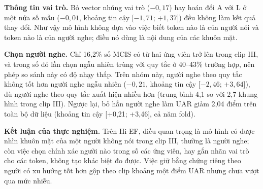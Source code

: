 \textbf{Thông tin vai trò.} Bỏ vector nhúng vai trò ($-0{,}17$) hay hoán đổi A với L ở một nửa số mẫu ($-0{,}01$, khoảng tin cậy [$-1{,}71$; $+1{,}37$]) đều không làm kết quả thay đổi. Như vậy mô hình không dựa vào việc biết token nào là của người nói và token nào là của người nghe; điều nó dùng là nội dung của các khuôn mặt.

\textbf{Chọn người nghe.} Chỉ 16,2\% số MCIS có từ hai ứng viên trở lên trong clip III, và trong số đó lần chọn ngẫu nhiên trùng với quy tắc ở 40--43\% trường hợp, nên phép so sánh này có độ nhạy thấp. Trên nhóm này, người nghe theo quy tắc không tốt hơn người nghe ngẫu nhiên ($-0{,}21$, khoảng tin cậy [$-2{,}46$; $+3{,}64$]), dù người nghe theo quy tắc xuất hiện nhiều hơn (trung bình 4,1 so với 2,7 khung hình trong clip III). Ngược lại, bỏ hẳn người nghe làm UAR giảm 2,04 điểm trên toàn bộ dữ liệu (khoảng tin cậy [+0,21; +3,46], cả năm fold).

\textbf{Kết luận của thực nghiệm.} Trên Hi-EF, điều quan trọng là mô hình có được nhìn khuôn mặt của một người không nói trong clip III, thường là người nghe; còn việc chọn chính xác người nào trong số các ứng viên, hay gắn nhãn vai trò cho các token, không tạo khác biệt đo được. Việc giữ bằng chứng riêng theo người có xu hướng tốt hơn gộp theo clip khoảng một điểm UAR nhưng chưa vượt qua mức nhiễu.

